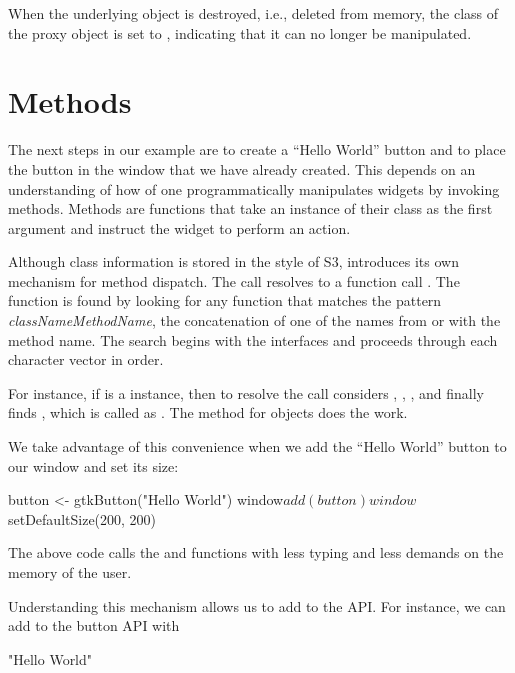 When the underlying \GTK\/ object is destroyed, i.e., deleted
from memory, the class of the proxy object is set to ,
indicating that it can no longer be manipulated.

\section{Methods}

The next steps in our example are to create a ``Hello World'' button
and to place the button in the window that we have already
created. This depends on an understanding of how of one
programmatically manipulates widgets by invoking methods.  Methods are
functions that take an instance of their class as the first argument
and instruct the widget to perform an action.

Although class information is stored in the style of S3, 
introduces its own mechanism for method dispatch.  The call
  resolves to a function call
. The function is found by looking for any function
that matches the pattern \emph{classNameMethodName}, the concatenation
of one of the names from  or 
with the method name. The search begins with the interfaces and
proceeds through each character vector in order.

For instance, if  is a  instance, then
to resolve the call   considers
, ,
,  and finally finds
, which is called as
. The  method
for  objects does the work.

We take advantage of this convenience when we add the ``Hello World''
button to our window and set its size:
\begin{Schunk}
\begin{Sinput}
 button <- gtkButton("Hello World")
 window$add(button)
 window$setDefaultSize(200, 200)
\end{Sinput}
\end{Schunk}
%
The above code calls the  and
 functions with less typing and less
demands on the memory of the user.

Understanding this mechanism allows us to add to the 
API. For instance, we can add to the button API with
\begin{Schunk}
\begin{Soutput}
[1] "Hello World"
\end{Soutput}
\end{Schunk}

